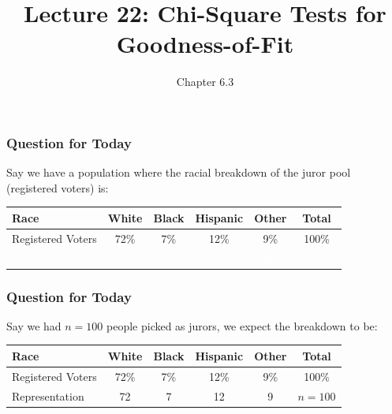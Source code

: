 \documentclass[handout]{beamer}
\title{Lecture 22: Chi-Square Tests for Goodness-of-Fit}
\author{Chapter 6.3}
\date{}
\newcommand{\blue}[1]{\textcolor{blue2}{#1}}
\begin{document}
\begin{frame}
\titlepage
\end{frame}


\begin{frame}[fragile]
\frametitle{Question for Today}
Say we have a population where the racial breakdown of the juror pool (registered voters) is:

\begin{center}
\begin{tabular}{l||cccc|c}
Race & White & Black & Hispanic & Other & Total \\ 
\hline
Registered Voters & 72\% & 7\% & 12\% & 9\% & 100\%\\ 
\textcolor{white}{Representation} & \textcolor{white}{0} & \textcolor{white}{0} & \textcolor{white}{0} & \textcolor{white}{100} & \textcolor{white}{$n=100$} \\ 
\end{tabular}
\end{center}

\end{frame}


\begin{frame}[fragile]
\frametitle{Question for Today}
Say we had $n=100$ people picked as jurors, we \blue{expect} the breakdown to be:

\begin{center}
\begin{tabular}{l||cccc|c}
Race & White & Black & Hispanic & Other & Total \\ 
\hline
Registered Voters & 72\% & 7\% & 12\% & 9\% & 100\%\\ 
Representation & 72 & 7 & 12 & 9 & $n=100$ \\ 
\end{tabular}
\end{center}

\end{frame}
\end{document}
